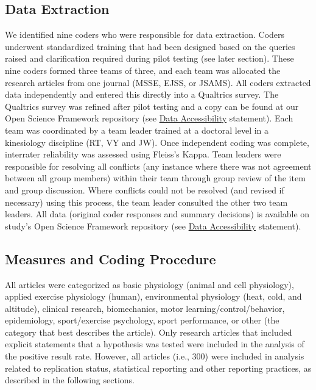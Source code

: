 \documentclass[]{cik}%
\begin{document}
\hypertarget{data-extraction}{%
\subsection{Data Extraction}\label{data-extraction}}

We identified nine coders who were responsible for data extraction.
Coders underwent standardized training that had been designed based on
the queries raised and clarification required during pilot testing (see
later section). These nine coders formed three teams of three, and each
team was allocated the research articles from one journal (MSSE, EJSS,
or JSAMS). All coders extracted data independently and entered this
directly into a Qualtrics survey. The Qualtrics survey was refined after
pilot testing and a copy can be found at our Open Science Framework
repository (see \protect\hyperlink{data}{Data Accessibility} statement).
Each team was coordinated by a team leader trained at a doctoral level
in a kinesiology discipline (RT, VY and JW). Once independent coding was
complete, interrater reliability was assessed using Fleiss's Kappa. Team
leaders were responsible for resolving all conflicts (any instance where
there was not agreement between all group members) within their team
through group review of the item and group discussion. Where conflicts
could not be resolved (and revised if necessary) using this process, the
team leader consulted the other two team leaders. All data (original
coder responses and summary decisions) is available on study's Open
Science Framework repository (see \protect\hyperlink{data}{Data
Accessibility} statement).

\hypertarget{measures-and-coding-procedure}{%
\subsection{Measures and Coding
Procedure}\label{measures-and-coding-procedure}}

All articles were categorized as basic physiology (animal and cell
physiology), applied exercise physiology (human), environmental
physiology (heat, cold, and altitude), clinical research, biomechanics,
motor learning/control/behavior, epidemiology, sport/exercise
psychology, sport performance, or other (the category that best
describes the article). Only research articles that included explicit
statements that a hypothesis was tested were included in the analysis of
the positive result rate. However, all articles (i.e., 300) were
included in analysis related to replication status, statistical
reporting and other reporting practices, as described in the following
sections.
\end{document}

